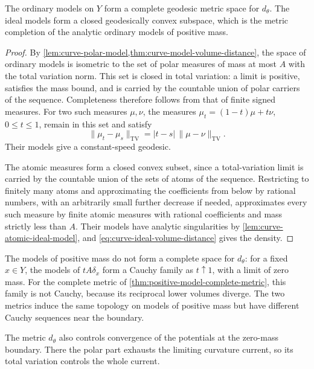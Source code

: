 \begin{corollary}\label{cor:curve-zero-volume-ideal-completion}\label{cor:curve-model-completeness}
The ordinary models on $Y$ form a complete geodesic metric space for $d_\theta$. The ideal models form a closed geodesically convex subspace, which is the metric completion of the analytic ordinary models of positive mass.
\end{corollary}
\begin{proof}
By \cref{lem:curve-polar-model,thm:curve-model-volume-distance}, the space of ordinary models is isometric to the set of polar measures of mass at most $A$ with the total variation norm. This set is closed in total variation: a limit is positive, satisfies the mass bound, and is carried by the countable union of polar carriers of the sequence. Completeness therefore follows from that of finite signed measures. For two such measures $\mu,\nu$, the measures $\mu_t=(1-t)\mu+t\nu$, $0\leq t\leq1$, remain in this set and satisfy
\[
 \|\mu_t-\mu_s\|_{\mathrm{TV}}=|t-s|\,\|\mu-\nu\|_{\mathrm{TV}}.
\]
Their models give a constant-speed geodesic.

The atomic measures form a closed convex subset, since a total-variation limit is carried by the countable union of the sets of atoms of the sequence. Restricting to finitely many atoms and approximating the coefficients from below by rational numbers, with an arbitrarily small further decrease if needed, approximates every such measure by finite atomic measures with rational coefficients and mass strictly less than $A$. Their models have analytic singularities by \cref{lem:curve-atomic-ideal-model}, and \eqref{eq:curve-ideal-volume-distance} gives the density.
\end{proof}

The models of positive mass do not form a complete space for $d_\theta$: for a fixed $x\in Y$, the models of $tA\delta_x$ form a Cauchy family as $t\uparrow1$, with a limit of zero mass. For the complete metric of \cref{thm:positive-model-complete-metric}, this family is not Cauchy, because its reciprocal lower volumes diverge. The two metrics induce the same topology on models of positive mass but have different Cauchy sequences near the boundary.

The metric $d_\theta$ also controls convergence of the potentials at the zero-mass boundary. There the polar part exhausts the limiting curvature current, so its total variation controls the whole current.

